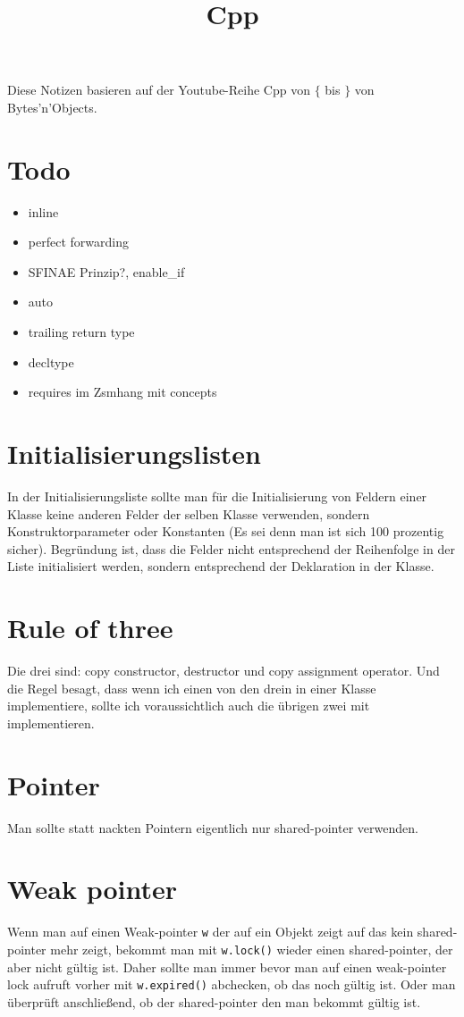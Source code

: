 \documentclass[paper=a4,10pt]{scrartcl}
\begin{document}
\title{Cpp}
Diese Notizen basieren auf der Youtube-Reihe Cpp von $\{$ bis $\}$ von Bytes'n'Objects. 

\section{Todo}
\begin{itemize}
\item inline
\item perfect forwarding
\item SFINAE Prinzip?, enable\_if
\item auto
\item trailing return type
\item decltype
\item requires im Zsmhang mit concepts
\end{itemize}

\section{Initialisierungslisten}
In der Initialisierungsliste sollte man für die Initialisierung von Feldern einer Klasse keine anderen Felder der selben Klasse verwenden, sondern Konstruktorparameter oder Konstanten (Es sei denn man ist sich 100 prozentig sicher). Begründung ist, dass die Felder nicht entsprechend der Reihenfolge in der Liste initialisiert werden, sondern entsprechend der Deklaration in der Klasse.

\section{Rule of three}
Die drei sind: copy constructor, destructor und copy assignment operator. Und die Regel besagt, dass wenn ich einen von den drein in einer Klasse implementiere, sollte ich voraussichtlich auch die übrigen zwei mit implementieren.

\section{Pointer}
Man sollte statt nackten Pointern eigentlich nur shared-pointer verwenden.

\section{Weak pointer}
Wenn man auf einen Weak-pointer \texttt{w} der auf ein Objekt zeigt auf das kein shared-pointer mehr zeigt, bekommt man mit \texttt{w.lock()} wieder einen shared-pointer, der aber nicht gültig ist. Daher sollte man immer bevor man auf einen weak-pointer lock aufruft vorher mit \texttt{w.expired()} abchecken, ob das noch gültig ist. Oder man überprüft anschließend, ob der shared-pointer den man bekommt gültig ist. 
\end{document}

